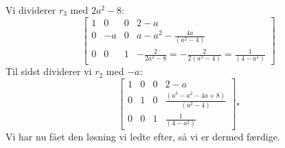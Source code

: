 \documentclass[a4paper,12pt]{article}
\begin{document}
Vi dividerer $r_3$ med $2a^2-8$:
\[
\left[\begin{array}{ccc|c}
    1 & 0 & 0 & 2-a \\
    0 & -a & 0 & a - a^2 -\frac{4a}{(a^2 - 4)} \\
    0 & 0 & 1 & -\frac{2}{2a^2-8} = -\frac{2}{2(a^2-4)} = \frac{1}{(4-a^2)}
\end{array}\right]
\]
Til sidst dividerer vi $r_2$ med $-a$:
\[
\left[\begin{array}{ccc|c}
    1 & 0 & 0 & 2-a \\
    0 & 1 & 0 & \frac{(a^3 - a^2 - 4a + 8)}{(a^2 - 4)} \\
    0 & 0 & 1 & \frac{1}{(4-a^2)}
\end{array}\right]
\square
\]
Vi har nu fået den løsning vi ledte efter, så vi er dermed færdige.
\end{document}
